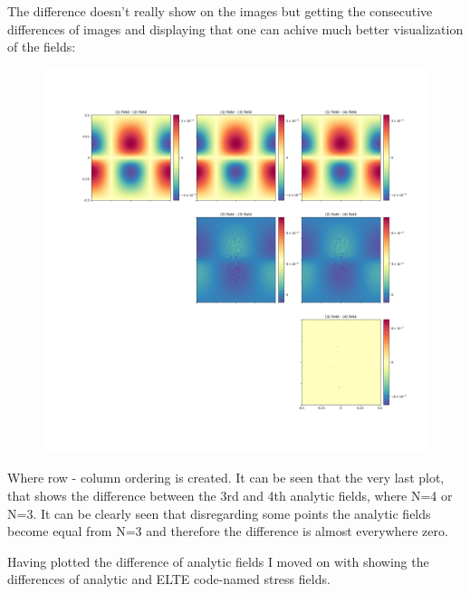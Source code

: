 \documentclass[12pt,a4paper]{article}
\theoremstyle{plain}
\begin{document}
\vspace{1cm}

\par The difference doesn't really show on the images but getting the
consecutive differences of images and displaying that one can achive
much better visualization of the fields:

\begin{figure}[H]
	\centering
	\includegraphics[width=.8\textwidth]{../difference_of_analytic_fields.png}
\end{figure}

\par Where row - column ordering is created. It can be seen that the very last plot,
that shows the difference between the 3rd and 4th analytic fields, where N=4 or N=3.
It can be clearly seen that disregarding some points the analytic fields become equal from N=3
and therefore the difference is almost everywhere zero.

\vspace{1cm}

\par Having plotted the difference of analytic fields I moved on with
showing the differences of analytic and ELTE code-named stress fields.
\end{document}
